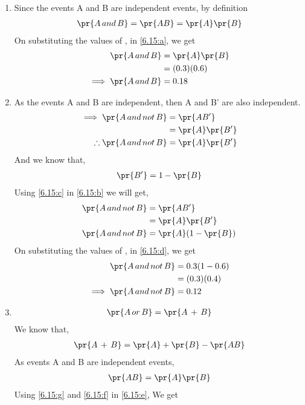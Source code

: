 \begin{enumerate}[label={\roman*)}]
\item
Since the events A and B are independent events, by definition
\begin{align}
    \pr{A\, and\, B} = \pr{AB}= \pr{A}\pr{B}\label{6.15:a}
\end{align}
On substituting the values of , in \eqref{6.15:a}, we get
\begin{align}
    \pr{A\, and\, B} &= \pr{A}\pr{B}\\
    &= (0.3)(0.6)\\
    \implies \pr{A\, and\, B}&=0.18
\end{align}
\item
As the events A and B are independent, then A and B' are also independent.
\begin{align}   
    \implies \pr{A\,and\,not\,B} &=\pr{AB'}\\
&= \pr{A}\pr{B'}\\
\therefore \pr{A\,and\,not\,B} &= \pr{A}\pr{B'}\label{6.15:b}
\end{align}
And we know that,
\begin{align}
    \pr{B'}=1-\pr{B}\label{6.15:c}
\end{align}
Using \eqref{6.15:c} in \eqref{6.15:b} we will get,
\begin{align}
   \pr{A\,and\,not\,B} &=\pr{AB'}\\
&= \pr{A}\pr{B'}\\
    \pr{A\,and\,not\,B} &= \pr{A}(1-\pr{B})\label{6.15:d}
\end{align}
On substituting the values of , in \eqref{6.15:d}, we get
\begin{align}
    \pr{A\,and\,not\,B} &= 0.3(1-0.6)\\
    &= (0.3)(0.4)\\
    \implies \pr{A\,and\,not\,B}&= 0.12
\end{align}
\item
\begin{align}
    \pr{A\,or\,B} =\pr{A\,+\,B}\label{6.15:e}
\end{align}
We know that,
\begin{align}
    \pr{A\,+\,B} = \pr{A} + \pr{B} -\pr{AB}\label{6.15:f}
\end{align}
As events A and B are independent events,
\begin{align}
    \pr{AB}=\pr{A}\pr{B}\label{6.15:g}
\end{align}
Using \eqref{6.15:g} and \eqref{6.15:f} in \eqref{6.15:e}, We get

\end{enumerate}
